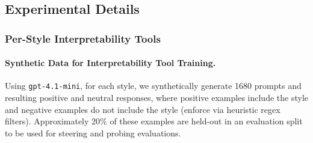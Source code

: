 \documentclass{article} %
\begin{document}
\subsection{Experimental Details}

\subsubsection{Per-Style Interpretability Tools}

\paragraph{Synthetic Data for Interpretability Tool Training.} Using \texttt{gpt-4.1-mini}, for each style, we synthetically generate 1680 prompts and resulting positive and neutral responses, where positive examples include the style and negative examples do not include the style (enforce via heuristic regex filters). Approximately 20\% of these examples are held-out in an evaluation split to be used for steering and probing evaluations.
\end{document}
